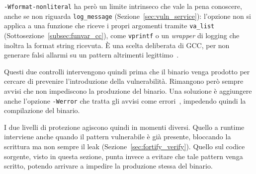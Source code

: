 \texttt{-Wformat-nonliteral} ha però un limite intrinseco che vale la pena conoscere, anche se non riguarda \texttt{log\_message} (Sezione~\ref{sec:vuln_service}): l'opzione non si applica a una funzione che riceve i propri argomenti tramite \texttt{va\_list} (Sottosezione~\ref{subsec:funvar_cc}), come \texttt{vprintf} o un \emph{wrapper} di logging che inoltra la format string ricevuta. È una scelta deliberata di GCC, per non generare falsi allarmi su un pattern altrimenti legittimo~\cite{gccwopts}.

Questi due controlli intervengono quindi prima che il binario venga prodotto per cercare di prevenire l'introduzione della vulnerabilità. Rimangono però sempre avvisi che non impediscono la produzione del binario. Una soluzione è aggiungere anche l'opzione \texttt{-Werror} che tratta gli avvisi come errori~\cite{gccwopts}, impedendo quindi la compilazione del binario.
 
I due livelli di protezione agiscono quindi in momenti diversi. Quello a runtime interviene anche quando il pattern vulnerabile è già presente, bloccando la scrittura ma non sempre il leak (Sezione~\ref{sec:fortify_verify}). Quello sul codice sorgente, visto in questa sezione, punta invece a evitare che tale pattern venga scritto, potendo arrivare a impedire la produzione stessa del binario.
